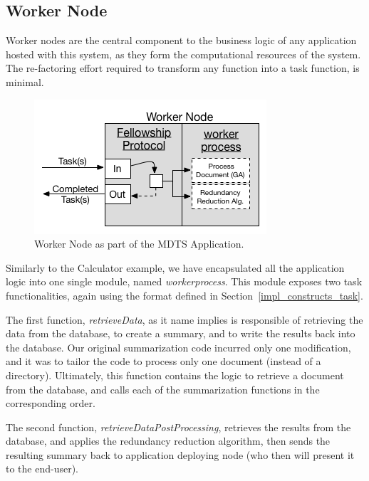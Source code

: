 \documentclass[12pt, titlepage]{uo_temp}
\begin{document}
     \subsection{Worker Node}
     Worker nodes are the central component to the business logic of any application
     hosted with this system, as they form the computational resources of the
     system. The re-factoring effort required to transform any function into a task
     function, is minimal.

     \begin{figure}[h!]
       \centering
       \includegraphics{images/mdts_worker.png}
       \caption{Worker Node as part of the MDTS Application.}
     \end{figure}

     Similarly to the Calculator example, we have encapsulated all the application logic
     into one single module, named \emph{workerprocess}. This module exposes two task
     functionalities, again using the format defined in Section~\ref{impl_constructs_task}. 

     The first function, \emph{retrieveData}, as it name implies is responsible of
     retrieving the data from the database, to create a summary, and to write the results
     back into the database. Our original summarization code incurred only one
     modification, and it was to tailor the code to process only one document (instead of
     a directory). Ultimately, this function contains the logic to retrieve a document from
     the database, and calls each of the summarization functions in the corresponding
     order.
     
     The second function, \emph{retrieveDataPostProcessing}, retrieves the results from
     the database, and applies the redundancy reduction algorithm, then sends the
     resulting summary back to application deploying node (who then will present it to the
     end-user).
     
\end{document}
